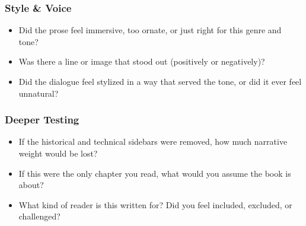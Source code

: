 \subsubsection*{Style \& Voice}

\begin{itemize}
\item Did the prose feel immersive, too ornate, or just right for this genre and tone?
\item Was there a line or image that stood out (positively or negatively)?
\item Did the dialogue feel stylized in a way that served the tone, or did it ever feel unnatural?
\end{itemize}

\subsubsection*{Deeper Testing}

\begin{itemize}
\item If the historical and technical sidebars were removed, how much narrative weight would be lost?
\item If this were the only chapter you read, what would you assume the book is about?
\item What kind of reader is this written for? Did you feel included, excluded, or challenged?
\end{itemize}




